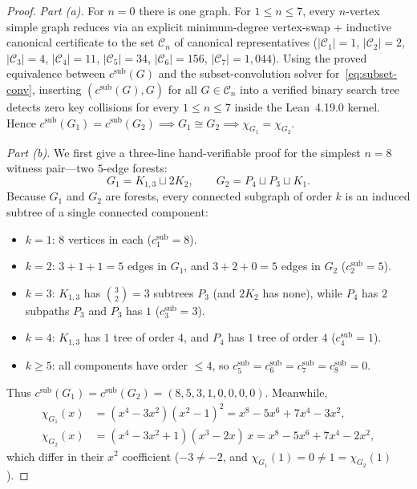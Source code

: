\documentclass[11pt]{article}
\theoremstyle{definition}
\newcommand{\csub}{c^{\mathrm{sub}}}
\begin{document}
\begin{proof}
\emph{Part (a).} For $n = 0$ there is one graph. For $1 \le n \le 7$, every $n$-vertex simple graph reduces via an explicit minimum-degree vertex-swap + inductive canonical certificate to the set $\mathcal{C}_n$ of canonical representatives ($|\mathcal{C}_1| = 1$, $|\mathcal{C}_2| = 2$, $|\mathcal{C}_3| = 4$, $|\mathcal{C}_4| = 11$, $|\mathcal{C}_5| = 34$, $|\mathcal{C}_6| = 156$, $|\mathcal{C}_7| = 1{,}044$). Using the proved equivalence between $\csub(G)$ and the subset-convolution solver for~\eqref{eq:subset-conv}, inserting $(\csub(G), G)$ for all $G \in \mathcal{C}_n$ into a verified binary search tree detects zero key collisions for every $1 \le n \le 7$ inside the Lean~4.19.0 kernel. Hence $\csub(G_1) = \csub(G_2) \implies G_1 \cong G_2 \implies \chi_{G_1} = \chi_{G_2}$.

\emph{Part (b).} We first give a three-line hand-verifiable proof for the simplest $n = 8$ witness pair---two $5$-edge forests:
\[
  G_1 = K_{1,3} \sqcup 2K_2, \qquad G_2 = P_4 \sqcup P_3 \sqcup K_1.
\]
Because $G_1$ and $G_2$ are forests, every connected subgraph of order $k$ is an induced subtree of a single connected component:
\begin{itemize}
  \item $k = 1$: $8$ vertices in each ($\csub_1 = 8$).
  \item $k = 2$: $3 + 1 + 1 = 5$ edges in $G_1$, and $3 + 2 + 0 = 5$ edges in $G_2$ ($\csub_2 = 5$).
  \item $k = 3$: $K_{1,3}$ has $\binom{3}{2} = 3$ subtrees $P_3$ (and $2K_2$ has none), while $P_4$ has $2$ subpaths $P_3$ and $P_3$ has $1$ ($\csub_3 = 3$).
  \item $k = 4$: $K_{1,3}$ has $1$ tree of order $4$, and $P_4$ has $1$ tree of order $4$ ($\csub_4 = 1$).
  \item $k \ge 5$: all components have order $\le 4$, so $\csub_5 = \csub_6 = \csub_7 = \csub_8 = 0$.
\end{itemize}
Thus $\csub(G_1) = \csub(G_2) = (8,5,3,1,0,0,0,0)$. Meanwhile,
\begin{align*}
  \chi_{G_1}(x) &= (x^4 - 3x^2)(x^2 - 1)^2 = x^8 - 5x^6 + 7x^4 - 3x^2,\\
  \chi_{G_2}(x) &= (x^4 - 3x^2 + 1)(x^3 - 2x)\,x = x^8 - 5x^6 + 7x^4 - 2x^2,
\end{align*}
which differ in their $x^2$ coefficient ($-3 \ne -2$, and $\chi_{G_1}(1) = 0 \ne 1 = \chi_{G_2}(1)$).


\end{proof}
\end{document}
